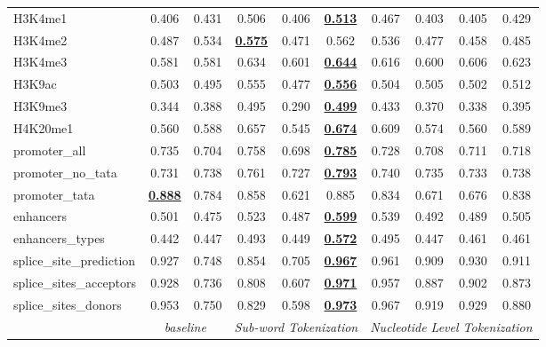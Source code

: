 \begin{table*}[h!]
\begin{center}
\begin{tabular}{l|cc|ccc|cccc}
H3K4me1 & 0.406 & 0.431 & 0.506 & 0.406 & {\ul \textbf{0.513}} & 0.467 & 0.403 & 0.405 & 0.429 \\
H3K4me2 & 0.487 & 0.534 & {\ul \textbf{0.575}} & 0.471 & 0.562 & 0.536 & 0.477 & 0.458 & 0.485 \\
H3K4me3 & 0.581 & 0.581 & 0.634 & 0.601 & {\ul \textbf{0.644}} & 0.616 & 0.600 & 0.606 & 0.623 \\
H3K9ac & 0.503 & 0.495 & 0.555 & 0.477 & {\ul \textbf{0.556}} & 0.504 & 0.505 & 0.502 & 0.512 \\
H3K9me3 & 0.344 & 0.388 & 0.495 & 0.290 & {\ul \textbf{0.499}} & 0.433 & 0.370 & 0.338 & 0.395 \\
H4K20me1 & 0.560 & 0.588 & 0.657 & 0.545 & {\ul \textbf{0.674}} & 0.609 & 0.574 & 0.560 & 0.589 \\
promoter\_all & 0.735 & 0.704 & 0.758 & 0.698 & {\ul \textbf{0.785}} & 0.728 & 0.708 & 0.711 & 0.718 \\
promoter\_no\_tata & 0.731 & 0.738 & 0.761 & 0.727 & {\ul \textbf{0.793}} & 0.740 & 0.735 & 0.733 & 0.738 \\
promoter\_tata & {\ul \textbf{0.888}} & 0.784 & 0.858 & 0.621 & 0.885 & 0.834 & 0.671 & 0.676 & 0.838 \\
enhancers & 0.501 & 0.475 & 0.523 & 0.487 & {\ul \textbf{0.599}} & 0.539 & 0.492 & 0.489 & 0.505 \\
enhancers\_types & 0.442 & 0.447 & 0.493 & 0.449 & {\ul \textbf{0.572}} & 0.495 & 0.447 & 0.461 & 0.461 \\
splice\_site\_prediction & 0.927 & 0.748 & 0.854 & 0.705 & {\ul \textbf{0.967}} & 0.961 & 0.909 & 0.930 & 0.911 \\
splice\_sites\_acceptors & 0.928 & 0.736 & 0.808 & 0.607 & {\ul \textbf{0.971}} & 0.957 & 0.887 & 0.902 & 0.873 \\
splice\_sites\_donors & 0.953 & 0.750 & 0.829 & 0.598 & {\ul \textbf{0.973}} & 0.967 & 0.919 & 0.929 & 0.880 \\
\hline
\multicolumn{1}{l|}{} & \multicolumn{2}{c|}{\textit{baseline}} & \multicolumn{3}{c|}{\textit{Sub-word Tokenization}} & \multicolumn{4}{c}{\textit{Nucleotide Level Tokenization}} \\ \hline
\end{tabular}
\end{center}
\end{table*}